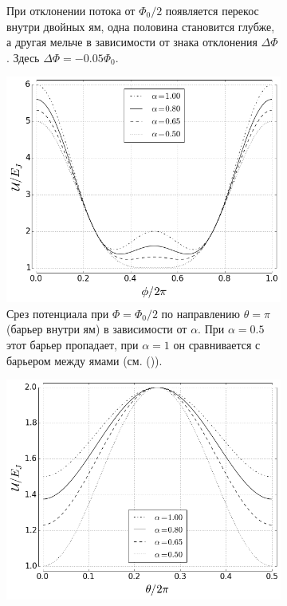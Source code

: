 \documentclass[12pt]{article}
\numberwithin{equation}{section}
\begin{document}
\begin{figure}[!p]
\begin{subfigure}[t]{0.49\linewidth}
\caption{При отклонении потока от $\Phi_0/2$ появляется перекос внутри двойных ям, одна половина становится глубже, а другая мельче в зависимости от знака отклонения $\Delta\Phi$. Здесь $\Delta\Phi=-0.05\Phi_0$.}
\label{fig:U3d2}
\end{subfigure}
\begin{subfigure}[t]{0.49\linewidth}
\centering
\includegraphics[height = 0.8\textwidth]{Pictures/qubit_potential_cut}
\caption{Срез потенциала при $\Phi = \Phi_0/2$ по направлению $\theta = \pi$ (барьер внутри ям) в зависимости от $\alpha$. При $\alpha = 0.5$ этот барьер пропадает, при $\alpha=1$ он сравнивается с барьером между ямами (см. ()).}
\label{fig:U_cut}\quad
\end{subfigure}
\begin{subfigure}[t]{0.49\linewidth}
\centering
\includegraphics[height = 0.8\textwidth]{Pictures/qubit_potential_cut2}

\end{subfigure}
\end{figure}
\end{document}
